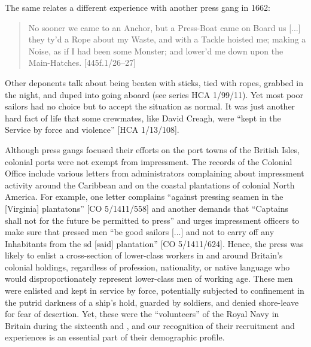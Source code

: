 The same  relates a different experience with another press gang in 1662:

\begin{quotation}
No sooner we came to an Anchor, but a Press-Boat came on Board us [...] they ty’d a Rope about my Waste, and with a Tackle hoisted me; making a Noise, as if I had been some Monster; and lower’d me down upon the Main-Hatches. [445f.1/26–27]\end{quotation}

Other deponents talk about being beaten with sticks, tied with ropes, grabbed in the night, and duped into going aboard (see series HCA 1/99/11). Yet most poor sailors had no choice but to accept the situation as normal. It was just another hard fact of life that some crewmates, like  David Creagh, were “kept in the Service by force and violence” [HCA 1/13/108]. 

  Although press gangs focused their efforts on the port towns of the British Isles, colonial ports were not exempt from impressment. The records of the Colonial Office include various letters from administrators complaining about impressment activity around the Caribbean and on the coastal plantations of colonial North America. For example, one letter complains “against pressing seamen in the [Virginia] plantatons” [CO 5/1411/558] and another demands that “Captains shall not for the future be permitted to press” and urges impressment officers to make sure that pressed men “be good sailors [...] and not to carry off any Inhabitants from the sd [said] plantation” [CO 5/1411/624]. Hence, the press was likely to enlist a cross-section of lower-class workers in and around Britain’s colonial holdings, regardless of profession, nationality, or native language who would disproportionately represent lower-class men of working age. These men were enlisted and kept in service by force, potentially subjected to confinement in the putrid darkness of a ship’s hold, guarded by soldiers, and denied shore-leave for fear of desertion. Yet, these were the “volunteers” of the Royal Navy in Britain during the sixteenth and , and our recognition of their recruitment and experiences is an essential part of their demographic profile.  

